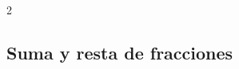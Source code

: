 \documentclass[12pt,addpoints]{repaso}
\begin{document}
\begin{questions}
{\begin{multicols}{2}
\begin{parts}




			\end{parts}
		\end{multicols}
	}


	

	\subsection{Suma y resta de fracciones}

\end{questions}
\end{document}
